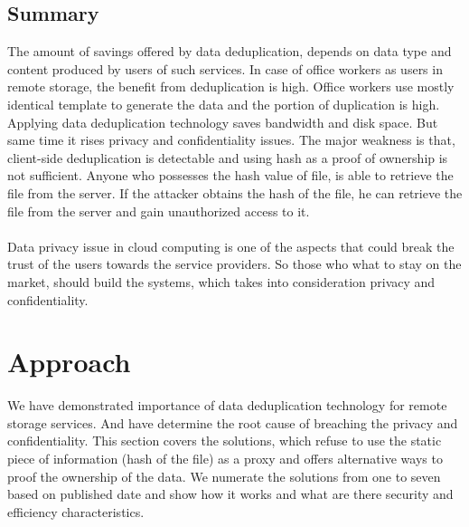 \documentclass[12pt]{article}
\begin{document}
\subsection{Summary}
\label{subsub:AttackSummary}
The amount of savings offered by data deduplication, depends on data type and content produced by users of such services.\cite{ratio}  In case of office workers as users in remote storage, the benefit from deduplication is high. Office workers use mostly identical template to generate the data and the portion of duplication is high. Applying data deduplication technology saves bandwidth and disk space.  But same time it rises privacy and confidentiality issues. The major weakness is that, client-side deduplication is detectable and using hash as a proof of ownership is not sufficient. Anyone who possesses the hash value of file, is able to retrieve the file from the server.  If the attacker  obtains the hash of the file, he can retrieve the file from the server and gain unauthorized access to it.\\\\
Data privacy issue in cloud computing is one of the aspects that could break the trust of the users towards the service providers. So those who what to stay on the market, should build the systems, which takes into consideration privacy and confidentiality.

\pagebreak

\section{Approach}
\label{sec:4}

We have demonstrated importance of data deduplication technology for remote storage services. And have determine the root  cause of breaching the privacy and confidentiality. This section covers the solutions, which refuse to use the static piece of information (hash of the file) as a proxy and offers alternative ways to proof the ownership of the data. We numerate the solutions from one to seven based on published date and show how it works and what are there security and efficiency characteristics. \\\\
\end{document}
